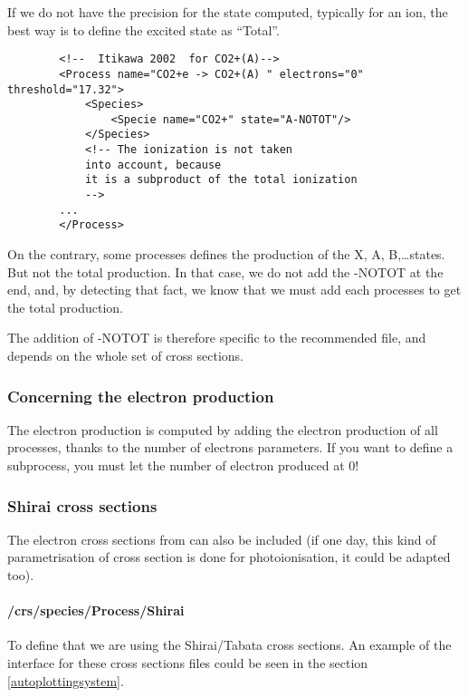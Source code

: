 If we do not have the precision for the state computed, typically for an ion, the best way is to define the excited state as ``Total''. 
\begin{verbatim}
		<!--  Itikawa 2002  for CO2+(A)-->
		<Process name="CO2+e -> CO2+(A) " electrons="0" threshold="17.32">
			<Species>
				<Specie name="CO2+" state="A-NOTOT"/>
			</Species>
			<!-- The ionization is not taken
			into account, because
			it is a subproduct of the total ionization
			-->
		...
		</Process>
\end{verbatim}

On the contrary, some processes defines the production of the X, A, B,\ldots states. But not the total production. In that case, we do not add the -NOTOT at the end, and, by detecting that fact, we know that we must add each processes to get the total production.

The addition of -NOTOT is therefore specific to the recommended file, and depends on the whole set of cross sections.




\subsubsection{Concerning the electron production}
The electron production is computed by adding the electron production of all processes, thanks to the number of electrons parameters. If you want to define a subprocess, you must let the number of electron produced at 0!

\subsubsection{Shirai cross sections}
The electron cross sections from \citet{Shirai2001,Shirai2002,Tabata2006} can also be included (if one day, this kind of parametrisation of cross section is done for photoionisation, it could be adapted too).

\paragraph{/crs/species/Process/Shirai} To define that we are using the Shirai/Tabata cross sections. An example of the interface for these cross sections files could be seen in the section \ref{autoplottingsystem}.
